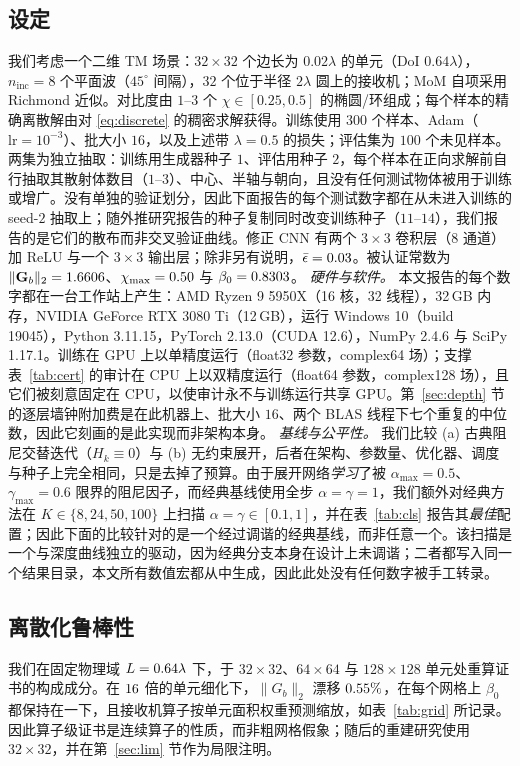\documentclass[UTF8,a4paper,11pt]{ctexart}
\newcommand{\norm}[1]{\lVert #1 \rVert}
\newcommand{\numv}[1]{#1}
\begin{document}
\subsection{设定}
\label{sec:setup}
我们考虑一个二维 TM 场景：$32\times32$ 个边长为 $0.02\lambda$ 的单元（DoI $0.64\lambda$），$n_{\mathrm{inc}}=8$ 个平面波（$45^\circ$ 间隔），$32$ 个位于半径 $2\lambda$ 圆上的接收机；MoM 自项采用 Richmond 近似。对比度由 $1$--$3$ 个 $\chi\in[0.25,0.5]$ 的椭圆/环组成；每个样本的精确离散解由对 \eqref{eq:discrete} 的稠密求解获得。训练使用 $300$ 个样本、Adam（$\mathrm{lr}=10^{-3}$）、批大小 $16$，以及上述带 $\lambda=0.5$ 的损失；评估集为 $100$ 个未见样本。两集为独立抽取：训练用生成器种子 $1$、评估用种子 $2$，每个样本在正向求解前自行抽取其散射体数目（$1$--$3$）、中心、半轴与朝向，且没有任何测试物体被用于训练或增广。没有单独的验证划分，因此下面报告的每个测试数字都在从未进入训练的 seed-$2$ 抽取上；随外推研究报告的种子复制同时改变训练种子（$11$--$14$），我们报告的是它们的散布而非交叉验证曲线。修正 CNN 有两个 $3\times3$ 卷积层（$8$ 通道）加 ReLU 与一个 $3\times3$ 输出层；除非另有说明，$\bar\epsilon=\numv{\epsbar}$。被认证常数为 $\norm{\mathbf{G}_b}_2=\numv{\gbnorm}$、$\chi_{\max}=\numv{\chimax}$ 与 $\beta_0=\numv{\betacert}$。
\emph{硬件与软件。} 本文报告的每个数字都在一台工作站上产生：AMD Ryzen 9 5950X（16 核，32 线程），32\,GB 内存，NVIDIA GeForce RTX 3080 Ti（12\,GB），运行 Windows 10（build 19045），Python 3.11.15，PyTorch 2.13.0（CUDA 12.6），NumPy 2.4.6 与 SciPy 1.17.1。训练在 GPU 上以单精度运行（float32 参数，complex64 场）；支撑表~\ref{tab:cert} 的审计在 CPU 上以双精度运行（float64 参数，complex128 场），且它们被刻意固定在 CPU，以使审计永不与训练运行共享 GPU。第~\ref{sec:depth} 节的逐层墙钟附加费是在此机器上、批大小 $16$、两个 BLAS 线程下七个重复的中位数，因此它刻画的是此实现而非架构本身。
\emph{基线与公平性。} 我们比较 (a) 古典阻尼交替迭代（$H_k\equiv0$）与 (b) 无约束展开，后者在架构、参数量、优化器、调度与种子上完全相同，只是去掉了预算。由于展开网络\emph{学习}了被 $\alpha_{\max}=0.5$、$\gamma_{\max}=0.6$ 限界的阻尼因子，而经典基线使用全步 $\alpha=\gamma=1$，我们额外对经典方法在 $K\in\{8,24,50,100\}$ 上扫描 $\alpha=\gamma\in[0.1,1]$，并在表~\ref{tab:cls} 报告其\emph{最佳}配置；因此下面的比较针对的是一个经过调谐的经典基线，而非任意一个。该扫描是一个与深度曲线独立的驱动，因为经典分支本身在设计上未调谐；二者都写入同一个结果目录，本文所有数值宏都从中生成，因此此处没有任何数字被手工转录。
\subsection{离散化鲁棒性}
\label{sec:grid}
我们在固定物理域 $L=\numv{\NumGridL}\lambda$ 下，于 $32\times32$、$64\times64$ 与 $128\times128$ 单元处重算证书的构成成分。在 $\numv{\NumGridFactor}$ 倍的单元细化下，$\norm{G_b}_2$ 漂移 $\numv{\NumGridDriftGbPct}\%$，在每个网格上 $\beta_0$ 都保持在一下，且接收机算子按单元面积权重预测缩放，如表~\ref{tab:grid} 所记录。因此算子级证书是连续算子的性质，而非粗网格假象；随后的重建研究使用 $32\times32$，并在第~\ref{sec:lim} 节作为局限注明。
\end{document}
